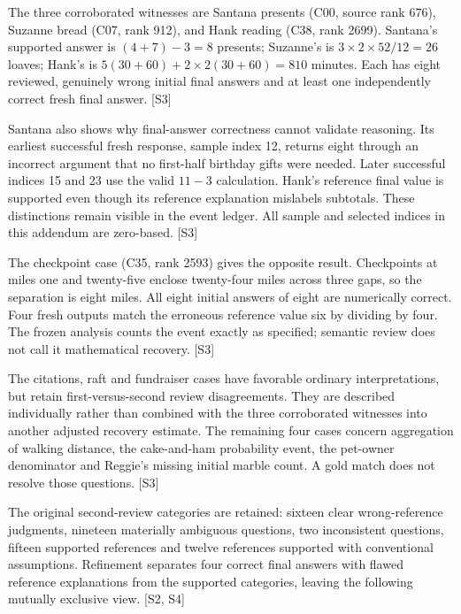 \documentclass[12pt,a4paper]{report}
\begin{document}
The three corroborated witnesses are Santana presents (C00, source rank
676), Suzanne bread (C07, rank 912), and Hank reading (C38, rank 2699).
Santana's supported answer is \((4+7)-3=8\) presents; Suzanne's is
\(3\times2\times52/12=26\) loaves; Hank's is
\(5(30+60)+2\times2(30+60)=810\) minutes. Each has eight reviewed,
genuinely wrong initial final answers and at least one independently
correct fresh final answer. {[}S3{]}

Santana also shows why final-answer correctness cannot validate
reasoning. Its earliest successful fresh response, sample index 12,
returns eight through an incorrect argument that no first-half birthday
gifts were needed. Later successful indices 15 and 23 use the valid
\(11-3\) calculation. Hank's reference final value is supported even
though its reference explanation mislabels subtotals. These distinctions
remain visible in the event ledger. All sample and selected indices in
this addendum are zero-based. {[}S3{]}

The checkpoint case (C35, rank 2593) gives the opposite result.
Checkpoints at miles one and twenty-five enclose twenty-four miles
across three gaps, so the separation is eight miles. All eight initial
answers of eight are numerically correct. Four fresh outputs match the
erroneous reference value six by dividing by four. The frozen analysis
counts the event exactly as specified; semantic review does not call it
mathematical recovery. {[}S3{]}

The citations, raft and fundraiser cases have favorable ordinary
interpretations, but retain first-versus-second review disagreements.
They are described individually rather than combined with the three
corroborated witnesses into another adjusted recovery estimate. The
remaining four cases concern aggregation of walking distance, the
cake-and-ham probability event, the pet-owner denominator and Reggie's
missing initial marble count. A gold match does not resolve those
questions. {[}S3{]}

The original second-review categories are retained: sixteen clear
wrong-reference judgments, nineteen materially ambiguous questions, two
inconsistent questions, fifteen supported references and twelve
references supported with conventional assumptions. Refinement separates
four correct final answers with flawed reference explanations from the
supported categories, leaving the following mutually exclusive view.
{[}S2, S4{]}
\end{document}
